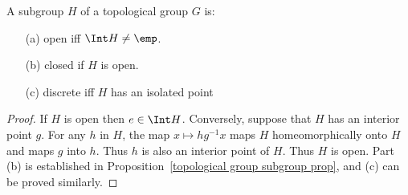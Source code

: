 \begin{proposition}
A subgroup $H$ of a topological group $G$ is:
\begin{itemize}
\item[(a)] open iff $\Int H\neq\emp$.
\item[(b)] closed if $H$ is open.
\item[(c)] discrete iff $H$ has an isolated point
\end{itemize}
\end{proposition}
\begin{proof}
If $H$ is open then $e\in\Int H$. Conversely, suppose that $H$ has an interior point $g$. For any $h$ in $H$, the map $x\mapsto hg^{-1}x$ maps $H$ homeomorphically onto $H$ and maps $g$ into $h$. Thus $h$ is also an interior point of $H$. Thus $H$ is open. Part (b) is established in Proposition~\ref{topological group subgroup prop}, and (c) can be proved similarly.
\end{proof}
